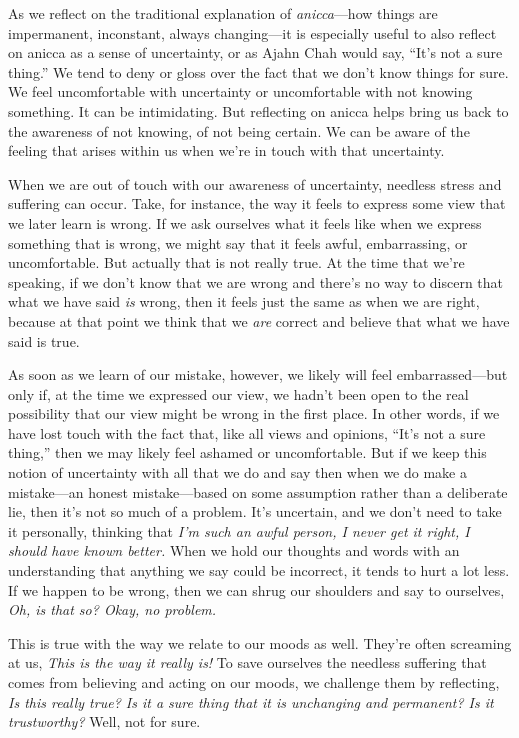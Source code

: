 
As we reflect on the traditional explanation of \emph{anicca}---how 
things are impermanent, inconstant, always changing---it is especially 
useful to also reflect on anicca as a sense of uncertainty, or as Ajahn 
Chah would say, ``It's not a sure thing.'' We tend to deny or gloss 
over the fact that we don't know things for sure. We feel uncomfortable 
with uncertainty or uncomfortable with not knowing something. It can be 
intimidating. But reflecting on anicca helps bring us back to the 
awareness of not knowing, of not being certain. We can be aware of the 
feeling that arises within us when we're in touch with that uncertainty.

When we are out of touch with our awareness of uncertainty, needless 
stress and suffering can occur. Take, for instance, the way it feels to 
express some view that we later learn is wrong. If we ask ourselves 
what it feels like when we express something that is wrong, we might 
say that it feels awful, embarrassing, or uncomfortable. But actually 
that is not really true. At the time that we're speaking, if we don't 
know that we are wrong and there's no way to discern that what we have 
said \emph{is} wrong, then it feels just the same as when we are right, 
because at that point we think that we \emph{are} correct and believe 
that what we have said is true.

As soon as we learn of our mistake, however, we likely will feel 
embarrassed---but only if, at the time we expressed our view, we hadn't 
been open to the real possibility that our view might be wrong in the 
first place. In other words, if we have lost touch with the fact that, 
like all views and opinions, ``It's not a sure thing,'' then we may 
likely feel ashamed or uncomfortable. But if we keep this notion of 
uncertainty with all that we do and say then when we do make a 
mistake---an honest mistake---based on some assumption rather than a 
deliberate lie, then it's not so much of a problem. It's uncertain, and 
we don't need to take it personally, thinking that \emph{I'm such an 
awful person, I never get it right, I should have known better.} When 
we hold our thoughts and words with an understanding that anything we 
say could be incorrect, it tends to hurt a lot less. If we happen to be 
wrong, then we can shrug our shoulders and say to ourselves, \emph{Oh, 
is that so? Okay, no problem.}

This is true with the way we relate to our moods as well. They're often 
screaming at us, \emph{This is the way it really is!} To save ourselves 
the needless suffering that comes from believing and acting on our 
moods, we challenge them by reflecting, \emph{Is this really true? Is 
it a sure thing that it is unchanging and permanent? Is it 
trustworthy?} Well, not for sure.

